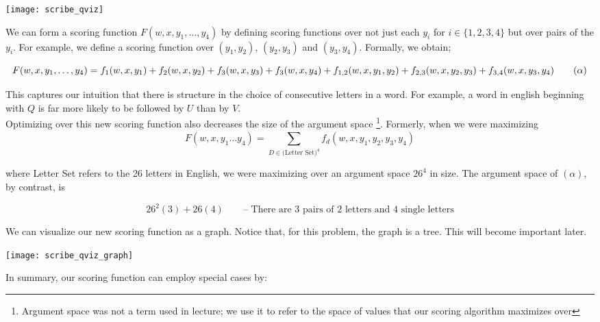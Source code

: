 \documentclass[../main.tex]{subfiles}
\begin{document}
    \begin{center}
        \texttt{[image: scribe\_qviz]}
    \end{center}

    We can form a scoring function $F(w, x, y_1, \dots, y_4)$ by defining scoring functions over not just each $y_i$ for $i \in \{1,2,3,4\}$ but over pairs of the $y_i$. For example, we define a scoring function over $(y_1,y_2)$, $(y_2,y_3)$ and $(y_3,y_4)$. Formally, we obtain;

    \begin{equation}
        F(w, x, y_1, \dots, y_4) = f_1(w,x,y_1) + f_2(w,x,y_2) + f_3(w,x,y_3) + f_3(w,x,y_4) + \\ f_{1,2}(w,x,y_1,y_2) + f_{2,3}(w,x,y_2,y_3) + f_{3,4}(w,x,y_3,y_4) \tag{$\alpha$}
    \end{equation}

    This captures our intuition that there is structure in the choice of consecutive letters in a word. For example, a word in english beginning with $Q$ is far more likely to be followed by $U$ than by $V$. \\

    Optimizing over this new scoring function also decreases the size of the argument space \footnote{Argument space was not a term used in lecture; we use it to refer to the space of values that our scoring algorithm maximizes over}. Formerly, when we were maximizing \\

    \[
        F(w, x, y_1 \dots y_4) = \sum_{D \in \text{(Letter Set)}^4}^{} f_d(w,x,y_1,y_2,y_3,y_4)
    \]

    where Letter Set refers to the 26 letters in English, we were maximizing over an argument space $26^4$ in size. The argument space of $(\alpha)$, by contrast, is 

    \[
        26^2(3) + 26(4) \qquad \text{-- There are 3 pairs of 2 letters and 4 single letters}
    \]

    We can visualize our new scoring function as a graph. Notice that, for this problem,
    the graph is a tree. This will become important later.

    \begin{center}
        \texttt{[image: scribe\_qviz\_graph]}
    \end{center}

    In summary, our scoring function can employ special cases by:
\end{document}
